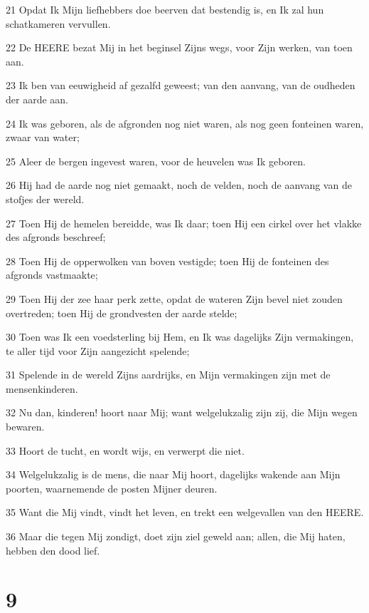 \par 21 Opdat Ik Mijn liefhebbers doe beerven dat bestendig is, en Ik zal hun schatkameren vervullen.
\par 22 De HEERE bezat Mij in het beginsel Zijns wegs, voor Zijn werken, van toen aan.
\par 23 Ik ben van eeuwigheid af gezalfd geweest; van den aanvang, van de oudheden der aarde aan.
\par 24 Ik was geboren, als de afgronden nog niet waren, als nog geen fonteinen waren, zwaar van water;
\par 25 Aleer de bergen ingevest waren, voor de heuvelen was Ik geboren.
\par 26 Hij had de aarde nog niet gemaakt, noch de velden, noch de aanvang van de stofjes der wereld.
\par 27 Toen Hij de hemelen bereidde, was Ik daar; toen Hij een cirkel over het vlakke des afgronds beschreef;
\par 28 Toen Hij de opperwolken van boven vestigde; toen Hij de fonteinen des afgronds vastmaakte;
\par 29 Toen Hij der zee haar perk zette, opdat de wateren Zijn bevel niet zouden overtreden; toen Hij de grondvesten der aarde stelde;
\par 30 Toen was Ik een voedsterling bij Hem, en Ik was dagelijks Zijn vermakingen, te aller tijd voor Zijn aangezicht spelende;
\par 31 Spelende in de wereld Zijns aardrijks, en Mijn vermakingen zijn met de mensenkinderen.
\par 32 Nu dan, kinderen! hoort naar Mij; want welgelukzalig zijn zij, die Mijn wegen bewaren.
\par 33 Hoort de tucht, en wordt wijs, en verwerpt die niet.
\par 34 Welgelukzalig is de mens, die naar Mij hoort, dagelijks wakende aan Mijn poorten, waarnemende de posten Mijner deuren.
\par 35 Want die Mij vindt, vindt het leven, en trekt een welgevallen van den HEERE.
\par 36 Maar die tegen Mij zondigt, doet zijn ziel geweld aan; allen, die Mij haten, hebben den dood lief.

\chapter{9}


